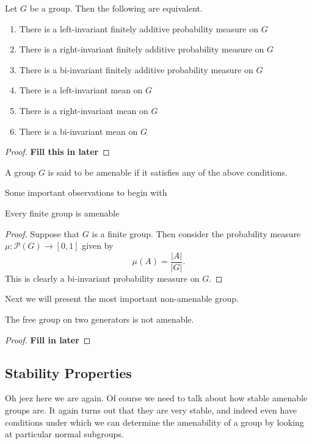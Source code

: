 \begin{propn}
  Let $G$ be a group. Then the following are equivalent.
  \begin{enumerate}
    \item There is a left-invariant finitely additive probability measure on $G$
    \item There is a right-invariant finitely additive probability measure on $G$
    \item There is a bi-invariant finitely additive probability measure on $G$
    \item There is a left-invariant mean on $G$
    \item There is a right-invariant mean on $G$
    \item There is a bi-invariant mean on $G$
  \end{enumerate}
\end{propn}
\begin{proof}
  \textbf{Fill this in later}
\end{proof}

\begin{defn}
  A group $G$ is said to be amenable if it satisfies any of the above
  conditions.
\end{defn}

Some important observations to begin with

\begin{propn}
  Every finite group is amenable
\end{propn}
\begin{proof}
  Suppose that $G$ is a finite group. Then consider the probability measure
  $\mu: \mathcal{P}(G) \to [0, 1]$ given by
  \[
    \mu(A) = \frac{|A|}{|G|}
  .\] 
  This is clearly a bi-invariant probability measure on $G$.
\end{proof}

Next we will present the most important non-amenable group.
\begin{thm}
  The free group on two generators is not amenable.
\end{thm}
\begin{proof}
  \textbf{Fill in later}
\end{proof}

\subsection{Stability Properties}%
\label{sub:Stability Properties}

Oh jeez here we are again. Of course we need to talk about how stable amenable
groups are. It again turns out that they are very stable, and indeed even have
conditions under which we can determine the amenability of a group by looking
at particular normal subgroups.

